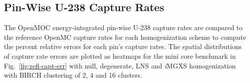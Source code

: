 \documentclass[12pt,twoside]{mitthesis-exec}
\begin{document}
%

\subsection*{Pin-Wise U-238 Capture Rates}

The OpenMOC energy-integrated pin-wise U-238 capture rates are compared to the reference OpenMC capture rates for each homogenization scheme to compute the percent relative errors for each pin's capture rates. The spatial distributions of capture rate errors are plotted as heatmaps for the mini core benchmark in Fig.~\ref{fig:refl-capt-err} with null, degenerate, LNS and \textit{i}MGXS homogenization with BIRCH clustering of 2, 4 and 16 clusters.
\end{document}
